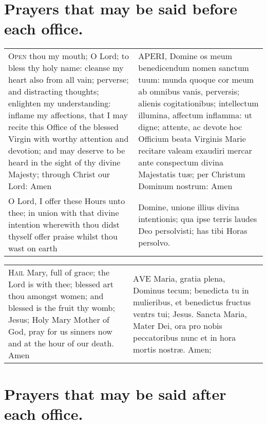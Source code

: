 \documentclass{article}
\newcommand{\primus}[2]{\Romantik\lettrine{#1}\rmfamily\normalfont\textsc{#2}}
\begin{document}
\begin{multicols*}{3}







\part{Prayers that may be said before each office.}
\begin{center}
	\begin{tabular}{ m{1.75in} | m{1.75in} }
		\primus{O}{pen} thou my mouth; O Lord; to bless thy holy name: cleanse my heart also from all vain; perverse; and distracting thoughts; enlighten my understanding: inflame my affections, that I may recite this Office of the blessed Virgin with worthy attention and devotion; and may deserve to be heard in the sight of thy divine Majesty; through Christ our Lord: Amen & \primus{A}{PERI}, Domine os meum benedicendum nomen sanctum tuum: munda quoque cor meum ab omnibus vanis, perversis; alienis cogitationibus; intellectum illumina, affectum inflamma: ut digne; attente, ac devote hoc Officium beata Virginis Marie recitare valeam exaudiri mercar ante conspectum divina Majestatis tu\ae; per Christum Dominum nostrum: Amen \\
		O Lord, I offer these Hours unto thee; in union with that divine intention wherewith thou didst thyself offer praise whilst thou wast on earth & Domine, unione illius divina intentionis; qua ipse terris laudes Deo persolvisti; has tibi Horas persolvo.
	\end{tabular}
\end{center}

\begin{center}
	\begin{tabular}{ m{1.75in} | m{1.75in} }
	\primus{H}{ail} Mary, full of grace; the Lord is with thee; blessed art thou amongst women; and blessed is the fruit thy womb; Jesus; Holy Mary Mother of God, pray for us sinners now and at the hour of our death. Amen & \primus{A}{VE} Maria, gratia plena, Dominus tecum; benedicta tu in mulieribus, et benedictus fructus ventrs tui; Jesus. Sancta Maria, Mater Dei, ora pro nobis peccatoribus nunc et in hora mortis nostr\ae. Amen;
	\end{tabular}
\end{center}


\part{Prayers that may be said after each office.}


\end{multicols*}
\end{document}
